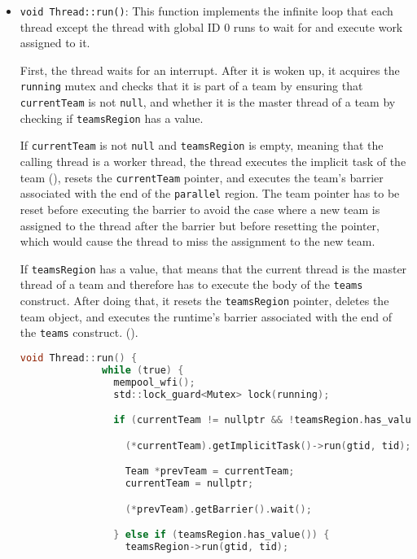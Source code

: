 \begin{itemize}
	\item \texttt{void Thread::run()}: This function implements the infinite loop that each thread
	      except the thread with global ID 0 runs to wait for and execute work assigned to it.

	      First, the thread waits for an interrupt. After it is woken up, it acquires the \texttt{running}
	      mutex and checks that it is part of a team by ensuring that \texttt{currentTeam} is not
	      \texttt{null}, and whether it is the master thread of a team by checking if
	      \texttt{teamsRegion} has a value.

	      If \texttt{currentTeam} is not \texttt{null} and \texttt{teamsRegion} is empty, meaning
	      that the calling thread is a worker thread, the thread executes the implicit task of the
	      team (), resets the \texttt{currentTeam} pointer, and executes the team's
	      barrier associated with the end of the \texttt{parallel} region. The team pointer has to
	      be reset before executing the barrier to avoid the case where a new team is assigned to
	      the thread after the barrier but before resetting the pointer, which would cause the
	      thread to miss the assignment to the new team.

	      If \texttt{teamsRegion} has a value, that means that the current thread is the master
	      thread of a team and therefore has to execute the body of the \texttt{teams} construct.
	      After doing that, it resets the \texttt{teamsRegion} pointer, deletes the team object, and
	      executes the runtime's barrier associated with the end of the \texttt{teams} construct.
	      ().

	      \begin{lstlisting}[language=C, caption={Thread::run}, label={lst:thread-run},
          escapechar=@]
            void Thread::run() {
              while (true) {
                mempool_wfi();
                std::lock_guard<Mutex> lock(running);

                if (currentTeam != nullptr && !teamsRegion.has_value()) {

                  (*currentTeam).getImplicitTask()->run(gtid, tid);

                  Team *prevTeam = currentTeam;
                  currentTeam = nullptr;

                  (*prevTeam).getBarrier().wait();

                } else if (teamsRegion.has_value()) {
                  teamsRegion->run(gtid, tid);


\end{lstlisting}
\end{itemize}
